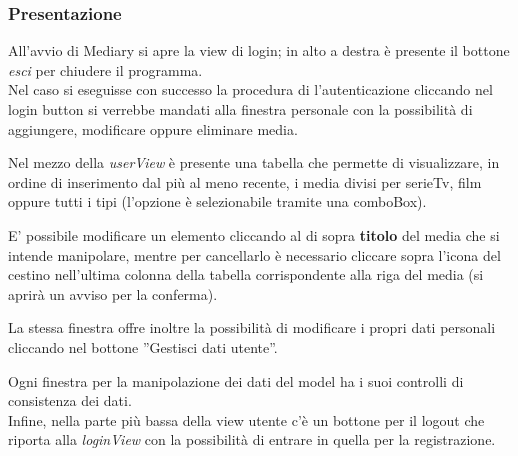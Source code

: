 \documentclass[10pt,a4paper,openany]{article}
\begin{document}
		\subsubsection{Presentazione}
		
		All'avvio di Mediary si apre la view di login; in alto a destra è presente il bottone \textit{esci} per chiudere il programma.\\
		Nel caso si eseguisse con successo la procedura di l'autenticazione cliccando nel login button si verrebbe mandati alla finestra personale con la possibilità di 
		aggiungere, modificare oppure eliminare media.

		Nel mezzo della \emph{userView} è presente una tabella che permette di visualizzare, in ordine di inserimento dal più al meno recente, i media divisi per 
		serieTv, film oppure tutti i tipi (l'opzione è selezionabile tramite una comboBox).

		E' possibile modificare un elemento cliccando al di sopra \textbf{titolo} del media che si intende manipolare, mentre per cancellarlo è necessario cliccare sopra 
		l'icona del cestino nell'ultima colonna della tabella corrispondente alla riga del media (si aprirà un avviso per la conferma).

		La stessa finestra offre inoltre la possibilità di modificare i propri dati personali cliccando nel bottone ''Gestisci dati utente''.

		Ogni finestra per la manipolazione dei dati del model ha i suoi controlli di consistenza dei dati.\\
		Infine, nella parte più bassa della view utente c'è un bottone per il logout che riporta alla \emph{loginView} con la possibilità di entrare in quella per la 
		registrazione.
		

	
\end{document}
